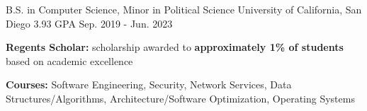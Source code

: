 

\begin{cventries}

    \cventry
    {B.S. in Computer Science, Minor in Political Science} %
    {University of California, San Diego} %
    {3.93 GPA} %
    {Sep. 2019 - Jun. 2023} %
    {
      \begin{cvitems} %
        \item {\textbf{Regents Scholar:} scholarship awarded to \textbf{approximately 1\% of students} based on academic excellence}
        \item {\textbf{Courses:} Software Engineering, Security, Network Services, Data Structures/Algorithms, Architecture/Software Optimization, Operating Systems}
      \end{cvitems}
    }

\end{cventries}
